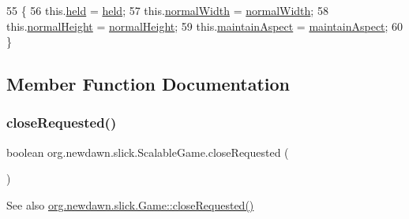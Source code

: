 \begin{DoxyCode}
55                                                                                               \{
56         this.\mbox{\hyperlink{classorg_1_1newdawn_1_1slick_1_1_scalable_game_a9f1fb24a0827c8d6619e682e6239a475}{held}} = \mbox{\hyperlink{classorg_1_1newdawn_1_1slick_1_1_scalable_game_a9f1fb24a0827c8d6619e682e6239a475}{held}};
57         this.\mbox{\hyperlink{classorg_1_1newdawn_1_1slick_1_1_scalable_game_a80c5555ac348d1b5224c9cf391baceae}{normalWidth}} = \mbox{\hyperlink{classorg_1_1newdawn_1_1slick_1_1_scalable_game_a80c5555ac348d1b5224c9cf391baceae}{normalWidth}};
58         this.\mbox{\hyperlink{classorg_1_1newdawn_1_1slick_1_1_scalable_game_a47e0975aeb3ea50e10207311e2e9371e}{normalHeight}} = \mbox{\hyperlink{classorg_1_1newdawn_1_1slick_1_1_scalable_game_a47e0975aeb3ea50e10207311e2e9371e}{normalHeight}};
59         this.\mbox{\hyperlink{classorg_1_1newdawn_1_1slick_1_1_scalable_game_aad26ba584204317d6d2bca9bbb5eb716}{maintainAspect}} = \mbox{\hyperlink{classorg_1_1newdawn_1_1slick_1_1_scalable_game_aad26ba584204317d6d2bca9bbb5eb716}{maintainAspect}};
60     \}
\end{DoxyCode}


\subsection{Member Function Documentation}
\mbox{\label{classorg_1_1newdawn_1_1slick_1_1_scalable_game_ad9a8b81977a256601f21e9574bb1d386}} 
\subsubsection{\texorpdfstring{close\+Requested()}{closeRequested()}}
{\footnotesize\ttfamily boolean org.\+newdawn.\+slick.\+Scalable\+Game.\+close\+Requested (\begin{DoxyParamCaption}{ }\end{DoxyParamCaption})\hspace{0.3cm}{\ttfamily [inline]}}

\begin{DoxySeeAlso}{See also}
\mbox{\hyperlink{interfaceorg_1_1newdawn_1_1slick_1_1_game_a186989e6f05f917447c004adfe2f2332}{org.\+newdawn.\+slick.\+Game\+::close\+Requested()}} 
\end{DoxySeeAlso}


